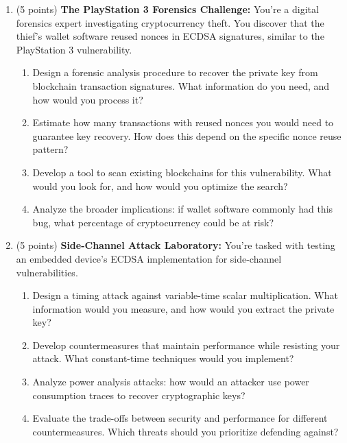 \documentclass[10pt,a4paper,american]{article}
\begin{document}
\begin{enumerate}
	\item (5 points) \textbf{The PlayStation 3 Forensics Challenge:}
	      You're a digital forensics expert investigating cryptocurrency theft. You discover that the thief's wallet software reused nonces in ECDSA signatures, similar to the PlayStation 3 vulnerability.
	      \begin{enumerate}
		      \item Design a forensic analysis procedure to recover the private key from blockchain transaction signatures. What information do you need, and how would you process it?
		      \item Estimate how many transactions with reused nonces you would need to guarantee key recovery. How does this depend on the specific nonce reuse pattern?
		      \item Develop a tool to scan existing blockchains for this vulnerability. What would you look for, and how would you optimize the search?
		      \item Analyze the broader implications: if wallet software commonly had this bug, what percentage of cryptocurrency could be at risk?
	      \end{enumerate}

	\item (5 points) \textbf{Side-Channel Attack Laboratory:}
	      You're tasked with testing an embedded device's ECDSA implementation for side-channel vulnerabilities.
	      \begin{enumerate}
		      \item Design a timing attack against variable-time scalar multiplication. What information would you measure, and how would you extract the private key?
		      \item Develop countermeasures that maintain performance while resisting your attack. What constant-time techniques would you implement?
		      \item Analyze power analysis attacks: how would an attacker use power consumption traces to recover cryptographic keys?
		      \item Evaluate the trade-offs between security and performance for different countermeasures. Which threats should you prioritize defending against?
	      \end{enumerate}


\end{enumerate}
\end{document}
